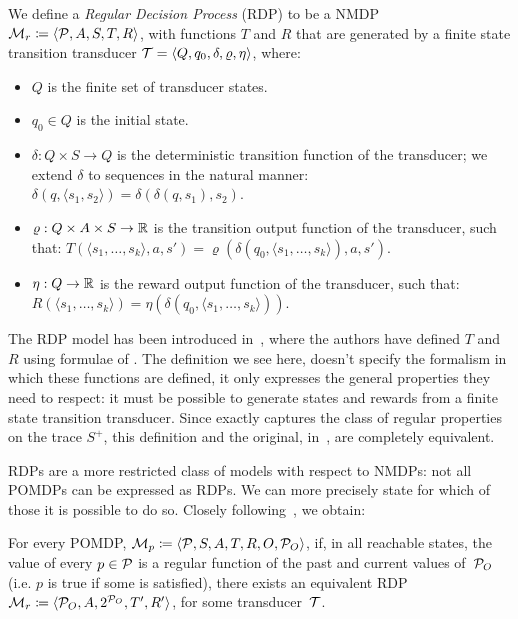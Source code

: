 \begin{definition}
	We define a \emph{Regular Decision Process} (RDP) to be a NMDP $\mathcal{M}_r \coloneqq \langle \mathcal{P}, A,
	S, T, R \rangle$, with functions $T$ and $R$ that are generated by a finite
	state transition transducer $\mathcal{T} = \langle Q, q_0, \delta, \varrho,
	\eta \rangle$, where:
	\begin{itemize}
		\item $Q$ is the finite set of transducer states.
		\item $q_0 \in Q$ is the initial state.
		\item $\delta: Q \times S \to Q$ is the deterministic transition function
			of the transducer; we extend $\delta$ to sequences in the natural
			manner: $\delta(q, \langle s_1, s_2 \rangle) = \delta(\delta(q, s_1),
			s_2)$.
		\item $\varrho: Q \times A \times S \to \mathbb{R}$ is the transition output
			function of the transducer, such that: $T(\langle s_1, \dots, s_k
			\rangle, a, s') = \varrho(\delta(q_0, \langle s_1, \dots, s_k \rangle),
			a, s')$.
		\item $\eta: Q \to \mathbb{R}$ is the reward output function of the transducer,
			such that: $R(\langle s_1, \dots, s_k \rangle) = \eta(\delta(q_0, \langle
			s_1, \dots, s_k \rangle))$.
	\end{itemize}
	\label{def:rdp}
\end{definition}
The RDP model has been introduced in~\cite{bib:rdp}, where the authors have
defined $T$ and $R$ using formulae of \ldl{}. The definition we see here,
doesn't specify the formalism in which these functions are defined, it only
expresses the general properties they need to respect: it must be possible to
generate states and rewards from a finite state transition transducer. Since
\ldl{} exactly captures the class of regular properties on the trace $S^+$,
this definition and the original, in~\cite{bib:rdp}, are completely
equivalent.

RDPs are a more restricted class of models with respect to NMDPs: not all
POMDPs can be expressed as RDPs. We can more precisely state for which of
those it is possible to do so. Closely following~\cite{bib:rdp}, we obtain:
\begin{theorem}
	For every POMDP, $\mathcal{M}_p \coloneqq \langle \mathcal{P}, S, A, T, R,
	O, \mathcal{P}_O \rangle$, if, in all reachable states, the value of every $p
	\in \mathcal{P}$ is a regular function of the past and current values
	of~$\mathcal{P}_O$ (i.e. $p$ is true if some \re{} is satisfied), there
	exists an equivalent RDP $\mathcal{M}_r \coloneqq \langle \mathcal{P}_O, A,
	2^{\mathcal{P}_O}, T', R' \rangle$, for some transducer~$\mathcal{T}$.
	\label{th:pomdp-rdp}
\end{theorem}

